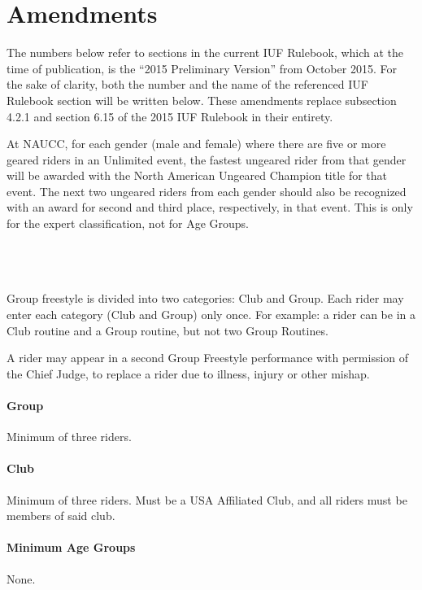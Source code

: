 \part{Amendments}

The numbers below refer to sections in the current IUF Rulebook, which at the time of publication, is the ``2015 Preliminary Version'' from October 2015. For the sake of clarity, both the number and the name of the referenced IUF Rulebook section will be written below. These amendments replace subsection 4.2.1 and section 6.15 of the 2015 IUF Rulebook in their entirety.

At NAUCC, for each gender (male and female) where there are five or more geared riders in an Unlimited event, the fastest ungeared rider from that gender will be awarded with the North American Ungeared Champion title for that event.
The next two ungeared riders from each gender should also be recognized with an award for second and third place, respectively, in that event.
This is only for the expert classification, not for Age Groups.

\\
\\
\\

Group freestyle is divided into two categories: Club and Group.
Each rider may enter each category (Club and Group) only once.
For example: a rider can be in a Club routine and a Group routine, but not two Group Routines.

A rider may appear in a second Group Freestyle performance with permission of the Chief Judge, to replace a rider due to illness, injury or other mishap.

\subsection{Group}
Minimum of three riders.

\subsection{Club}
Minimum of three riders. Must be a USA Affiliated Club, and all riders must be members of said club.

\subsection{Minimum Age Groups}
None.

